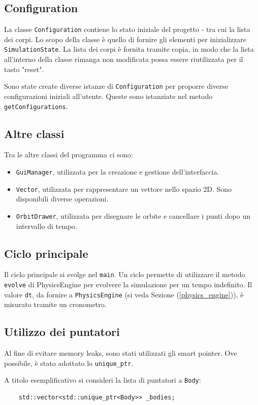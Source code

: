 \documentclass{article}
\begin{document}
\subsection{Configuration}
La classe \verb|Configuration| contiene lo stato iniziale del progetto - tra cui la lista dei corpi. Lo scopo della classe è quello di fornire gli elementi per inizializzare \verb|SimulationState|. La lista dei corpi è fornita tramite copia, in modo che la lista all'interno della classe rimanga non modificata possa essere riutilizzata per il tasto "reset".

Sono state create diverse istanze di \verb|Configuration| per proporre diverse configurazioni iniziali all'utente. Queste sono istanziate nel metodo \verb|getConfigurations|.

\subsection{Altre classi}
Tra le altre classi del programma ci sono:
\begin{itemize}
    \item \verb|GuiManager|, utilizzata per la creazione e gestione dell'interfaccia.
    \item \verb|Vector|, utilizzata per rappresentare un vettore nello spazio 2D. Sono disponibili diverse operazioni.
    \item \verb|OrbitDrawer|, utilizzata per disegnare le orbite e cancellare i punti dopo un intervallo di tempo.
\end{itemize}

\subsection{Ciclo principale}
Il ciclo principale si svolge nel \verb|main|. Un ciclo permette di utilizzare il metodo \verb|evolve| di PhysicsEngine per evolvere la simulazione per un tempo indefinito. Il valore \verb|dt|, da fornire a \verb|PhysicsEngine| (si veda Sezione (\ref{physics_engine})), è misurato tramite un cronometro.

\subsection{Utilizzo dei puntatori}
Al fine di evitare memory leaks, sono stati utilizzati gli smart pointer. Ove possibile, è stato adottato lo \verb|unique_ptr|.

A titolo esemplificativo si consideri la lista di puntatori a \verb|Body|:
\begin{verbatim}
    std::vector<std::unique_ptr<Body>> _bodies;
\end{verbatim}
\end{document}
